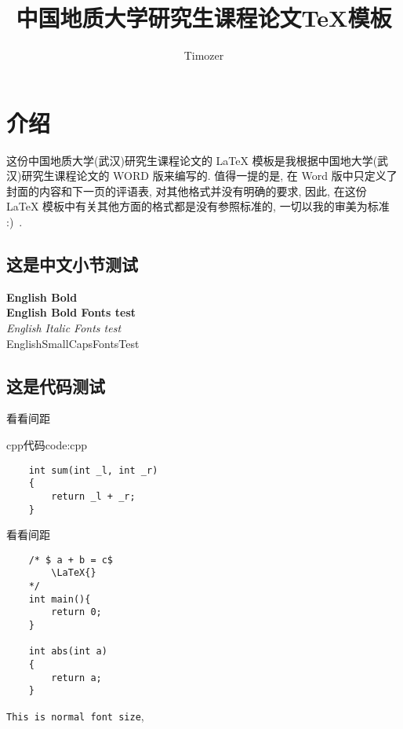 \documentclass{cugrep}
\title{中国地质大学研究生课程论文\TeX{}模板}
\author{Timozer}
\begin{document}
\maketitle
\frontmatter
{}
\makeabstract 
\tableofcontents
\clearpage
\mainmatter

\chapter{介绍}
这份中国地质大学(武汉)研究生课程论文的 \LaTeX{} 模板是我根据中国地大学(武汉)研究生课程论文的 {\sc WORD} 版来编写的. 
值得一提的是, 在 {\sc Word} 版中只定义了封面的内容和下一页的评语表, 对其他格式并没有明确的要求, 因此, 
在这份 \LaTeX{} 模板中有关其他方面的格式都是没有参照标准的, 一切以我的审美为标准 :)~.

\section{这是中文小节测试}
{
\noindent
{\textbf{English Bold}}\\
{\bf English Bold Fonts test} \\
{\textit{English Italic Fonts test}}\\
{\sc EnglishSmallCapsFontsTest}}
\section{这是代码测试}

看看间距

\begin{tcodeenv}{cpp代码}{code:cpp}
    \begin{verbatim}
    int sum(int _l, int _r)
    {
        return _l + _r;
    }
    \end{verbatim}
\end{tcodeenv}

看看间距
\begin{verbatim}
    /* $ a + b = c$ 
        \LaTeX{}
    */
    int main(){
        return 0;
    }

    int abs(int a)
    {
        return a;
    }
\end{verbatim}

{\tt This is normal font size}, 
\end{document}
